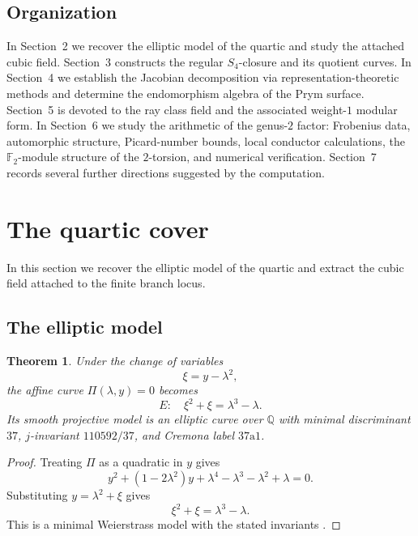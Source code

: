 \documentclass[11pt,letterpaper]{article}
\theoremstyle{plain}
\newtheorem{theorem}{Theorem}[section]
\theoremstyle{remark}
\newcommand{\QQ}{\mathbb{Q}}
\newcommand{\F}{\mathbb{F}}
\begin{document}
\subsection{Organization}
In Section~2 we recover the elliptic model of the quartic and study the attached cubic field. Section~3 constructs the regular \(S_4\)-closure and its quotient curves. In Section~4 we establish the Jacobian decomposition via representation-theoretic methods and determine the endomorphism algebra of the Prym surface. Section~5 is devoted to the ray class field and the associated weight-\(1\) modular form. In Section~6 we study the arithmetic of the genus-\(2\) factor: Frobenius data, automorphic structure, Picard-number bounds, local conductor calculations, the \(\F_2\)-module structure of the \(2\)-torsion, and numerical verification. Section~7 records several further directions suggested by the computation.

\section{The quartic cover}

In this section we recover the elliptic model of the quartic and extract the cubic field attached to the finite branch locus.

\subsection{The elliptic model}

\begin{theorem}\label{thm:elliptic}
Under the change of variables
\[
\xi=y-\lambda^2,
\]
the affine curve \(\Pi(\lambda,y)=0\) becomes
\begin{equation}\label{eq:elliptic}
E:\quad \xi^2+\xi=\lambda^3-\lambda.
\end{equation}
Its smooth projective model is an elliptic curve over \(\QQ\) with minimal discriminant \(37\), \(j\)-invariant \(110592/37\), and Cremona label \(37\mathrm{a}1\).
\end{theorem}

\begin{proof}
Treating \(\Pi\) as a quadratic in \(y\) gives
\[
y^2+(1-2\lambda^2)y+\lambda^4-\lambda^3-\lambda^2+\lambda=0.
\]
Substituting \(y=\lambda^2+\xi\) gives
\[
\xi^2+\xi=\lambda^3-\lambda.
\]
This is a minimal Weierstrass model with the stated invariants \cite{Silverman2009,LMFDBEllipticCurve37a1}.
\end{proof}
\end{document}

